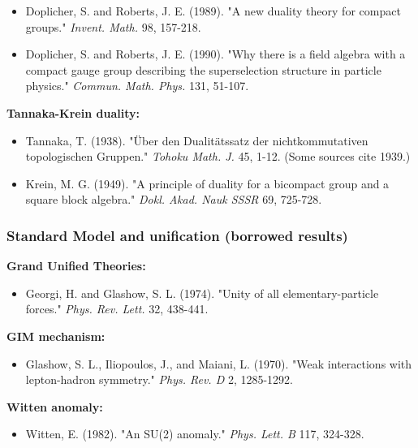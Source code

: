 \begin{itemize}
\tightlist
\item
  Doplicher, S. and Roberts, J. E. (1989). "A new duality theory for compact groups." \emph{Invent. Math.} 98, 157-218.
\item
  Doplicher, S. and Roberts, J. E. (1990). "Why there is a field algebra with a compact gauge group describing the superselection structure in particle physics." \emph{Commun. Math. Phys.} 131, 51-107.
\end{itemize}

\textbf{Tannaka-Krein duality:}

\begin{itemize}
\tightlist
\item
  Tannaka, T. (1938). "\"{U}ber den Dualit\"{a}tssatz der nichtkommutativen topologischen Gruppen." \emph{Tohoku Math. J.} 45, 1-12. (Some sources cite 1939.)
\item
  Krein, M. G. (1949). "A principle of duality for a bicompact group and a square block algebra." \emph{Dokl. Akad. Nauk SSSR} 69, 725-728.
\end{itemize}

\subsubsection{Standard Model and unification (borrowed results)}\label{standard-model-and-unification-borrowed-results}

\textbf{Grand Unified Theories:}

\begin{itemize}
\tightlist
\item
  Georgi, H. and Glashow, S. L. (1974). "Unity of all elementary-particle forces." \emph{Phys. Rev. Lett.} 32, 438-441.
\end{itemize}

\textbf{GIM mechanism:}

\begin{itemize}
\tightlist
\item
  Glashow, S. L., Iliopoulos, J., and Maiani, L. (1970). "Weak interactions with lepton-hadron symmetry." \emph{Phys. Rev. D} 2, 1285-1292.
\end{itemize}

\textbf{Witten anomaly:}

\begin{itemize}
\tightlist
\item
  Witten, E. (1982). "An SU(2) anomaly." \emph{Phys. Lett. B} 117, 324-328.
\end{itemize}


